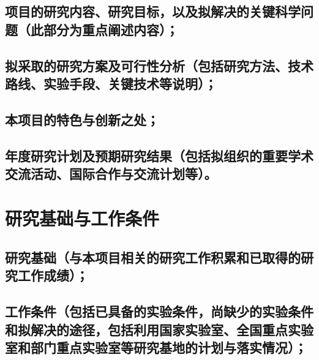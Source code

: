 \documentclass[UTF8, punct, oneside,fontset=none]{ctexbook}
\begin{document}
\section{\textbf{项目的研究内容、研究目标，以及拟解决的关键科学问题}（此部分为重点阐述内容）\textbf{；}}

\begin{MS}
	
\end{MS}

\section{\textbf{拟采取的研究方案及可行性分析}（包括研究方法、技术路线、实验手段、关键技术等说明）；}

\begin{MS}
	
\end{MS}

\section{\textbf{本项目的特色与创新之处；}}

\begin{MS}
	
\end{MS}

\section{\textbf{年度研究计划及预期研究结果}\kg{0.2em}（包括拟组织的重要学术交流活动、国际合作与交流计划等）。}

\begin{MS}
	
\end{MS}

\chapter{\textbf{研究基础与工作条件}}
\section{\textbf{研究基础}\kg{0.2em}（与本项目相关的研究工作积累和已取得的研究工作成绩）；}

\begin{MS}
	
\end{MS}

\section{\textbf{工作条件}\kg{0.2em}（包括已具备的实验条件，\kg{0.2em}尚缺少的实验条件和拟解决的途径，包括利用国家实验室、全国重点实验室和部门重点实验室等研究基地的计划与落实情况）；}
\end{document}
